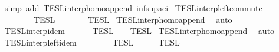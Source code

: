 \begin{isabellebody}
%
\isadelimproof
%
\endisadelimproof
%
\isatagproof
{}\isamarkupfalse%
\ {\isacharparenleft}simp\ add{\isacharcolon}\ TESL{\isacharunderscore}interp{\isacharunderscore}homo{\isacharunderscore}append\ inf{\isacharunderscore}sup{\isacharunderscore}aci{\isacharparenleft}{}{\isacharparenright}{\isacharparenright}%
\endisatagproof
{\isafoldproof}%
%
\isadelimproof
\isanewline
%
\endisadelimproof
\isanewline
{}\isamarkupfalse%
\ TESL{\isacharunderscore}interp{\isacharunderscore}left{\isacharunderscore}commute{\isacharcolon}\isanewline
\ \ {\isacartoucheopen}{\isasymlbrakk}{\isasymlbrakk}\ {\isasymPhi}\ {\isacharat}\ {\isacharparenleft}{\isasymPhi}\ {\isacharat}\ {\isasymPhi}\ {\isasymrbrakk}{\isasymrbrakk}\isactrlsub T\isactrlsub E\isactrlsub S\isactrlsub L\ {\isacharequal}\ {\isasymlbrakk}{\isasymlbrakk}\ {\isasymPhi}\ {\isacharat}\ {\isacharparenleft}{\isasymPhi}\ {\isacharat}\ {\isasymPhi}\ {\isasymrbrakk}{\isasymrbrakk}\isactrlsub T\isactrlsub E\isactrlsub S\isactrlsub L{\isacartoucheclose}\isanewline
%
\isadelimproof
%
\endisadelimproof
%
\isatagproof
{}\isamarkupfalse%
\ TESL{\isacharunderscore}interp{\isacharunderscore}homo{\isacharunderscore}append\ \isamarkupfalse%
\ auto%
\endisatagproof
{\isafoldproof}%
%
\isadelimproof
\isanewline
%
\endisadelimproof
\isanewline
{}\isamarkupfalse%
\ TESL{\isacharunderscore}interp{\isacharunderscore}idem{\isacharcolon}\isanewline
\ \ {\isacartoucheopen}{\isasymlbrakk}{\isasymlbrakk}\ {\isasymPhi}\ {\isacharat}\ {\isasymPhi}\ {\isasymrbrakk}{\isasymrbrakk}\isactrlsub T\isactrlsub E\isactrlsub S\isactrlsub L\ {\isacharequal}\ {\isasymlbrakk}{\isasymlbrakk}\ {\isasymPhi}\ {\isasymrbrakk}{\isasymrbrakk}\isactrlsub T\isactrlsub E\isactrlsub S\isactrlsub L{\isacartoucheclose}\isanewline
%
\isadelimproof
%
\endisadelimproof
%
\isatagproof
{}\isamarkupfalse%
\ TESL{\isacharunderscore}interp{\isacharunderscore}homo{\isacharunderscore}append\ \isamarkupfalse%
\ auto%
\endisatagproof
{\isafoldproof}%
%
\isadelimproof
\isanewline
%
\endisadelimproof
\isanewline
{}\isamarkupfalse%
\ TESL{\isacharunderscore}interp{\isacharunderscore}left{\isacharunderscore}idem{\isacharcolon}\isanewline
\ \ {\isacartoucheopen}{\isasymlbrakk}{\isasymlbrakk}\ {\isasymPhi}\ {\isacharat}\ {\isacharparenleft}{\isasymPhi}\ {\isacharat}\ {\isasymPhi}\ {\isasymrbrakk}{\isasymrbrakk}\isactrlsub T\isactrlsub E\isactrlsub S\isactrlsub L\ {\isacharequal}\ {\isasymlbrakk}{\isasymlbrakk}\ {\isasymPhi}\ {\isacharat}\ {\isasymPhi}\ {\isasymrbrakk}{\isasymrbrakk}\isactrlsub T\isactrlsub E\isactrlsub S\isactrlsub L{\isacartoucheclose}\isanewline

\end{isabellebody}
